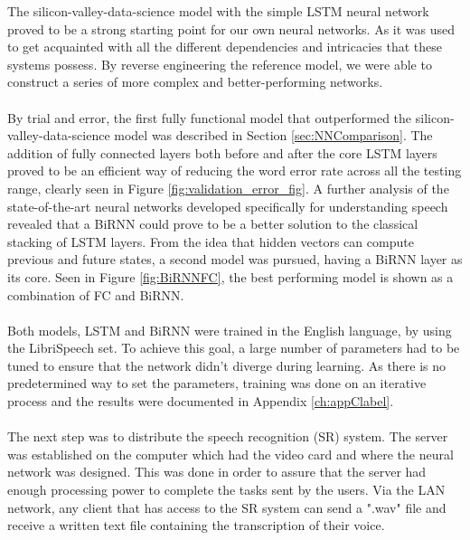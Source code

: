 The silicon-valley-data-science model with the simple 
LSTM neural network proved to be a strong starting point 
for our own neural networks. As it was used to get 
acquainted with all the different dependencies and 
intricacies that these systems possess.
By reverse engineering the reference model,
we were able to construct a series of more complex
and better-performing networks.\\\\ 
By trial and error, the first fully functional model 
that outperformed the silicon-valley-data-science model 
was described in Section \ref{sec:NNComparison}.
The addition of fully connected layers both before
and after the core LSTM layers proved to be an
efficient way of reducing the word error rate across
all the testing range, clearly seen in Figure 
\ref{fig:validation_error_fig}.
A further analysis of the state-of-the-art neural 
networks developed specifically for understanding
speech revealed that a BiRNN could prove to be a better 
solution to the classical stacking of LSTM layers.
From the idea that hidden vectors can compute
previous and future states, a second model was pursued,
having a BiRNN layer as its core.
Seen in Figure \ref{fig:BiRNNFC}, the best performing 
model is shown as a combination of FC and BiRNN.\\\\
Both models, LSTM and BiRNN were trained in the English 
language, by using the LibriSpeech set.
To achieve this goal, a large number of parameters had 
to be tuned to ensure that the network didn't diverge 
during learning.
As there is no predetermined way to set the parameters, 
training was done on an iterative process and the 
results were documented in Appendix
\ref{ch:appClabel}.\\\\
The next step was to distribute the speech recognition 
(SR) system.
The server was established on the computer which
had the video card and where the neural
network was designed.
This was done in order to assure that the server had
enough processing power to complete the tasks sent by
the users.
Via the LAN network, any client that has access
to the SR system can send a ".wav"
file and receive a written text file containing the
transcription of their voice.
